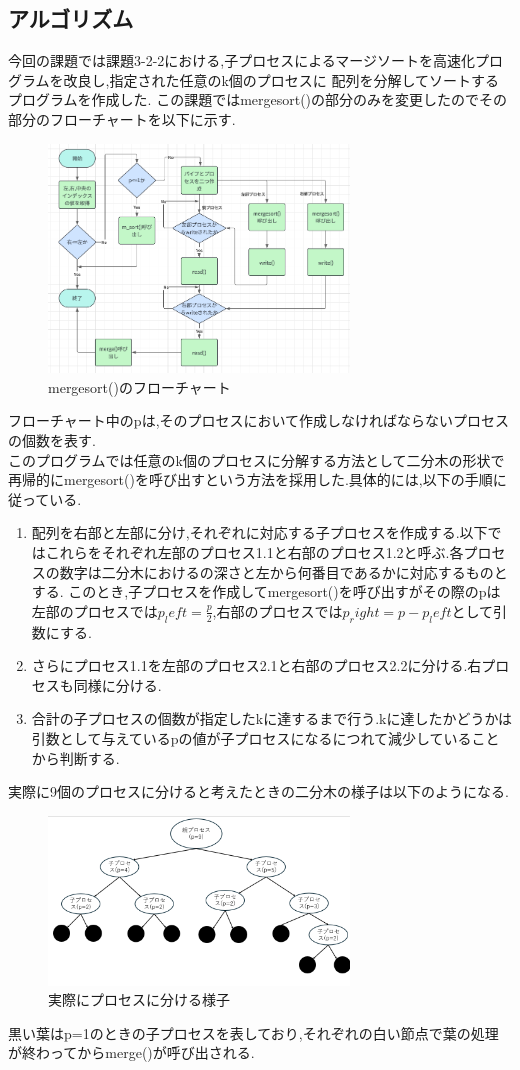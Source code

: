 \documentclass[dvipdfmx]{jarticle}
\begin{document}
\subsection{アルゴリズム}
今回の課題では課題3-2-2における,子プロセスによるマージソートを高速化プログラムを改良し,指定された任意のk個のプロセスに
配列を分解してソートするプログラムを作成した.
この課題ではmergesort()の部分のみを変更したのでその部分のフローチャートを以下に示す.
\begin{figure}[h]
    \centering
    \includegraphics[width=8cm]{hatten2hurotya.png}
    \caption{mergesort()のフローチャート}
\end{figure}
フローチャート中のpは,そのプロセスにおいて作成しなければならないプロセスの個数を表す.\\
このプログラムでは任意のk個のプロセスに分解する方法として二分木の形状で再帰的にmergesort()を呼び出すという方法を採用した.具体的には,以下の手順に従っている.
\begin{enumerate}
    \item 配列を右部と左部に分け,それぞれに対応する子プロセスを作成する.以下ではこれらをそれぞれ左部のプロセス1.1と右部のプロセス1.2と呼ぶ.各プロセスの数字は二分木におけるの深さと左から何番目であるかに対応するものとする.
    このとき,子プロセスを作成してmergesort()を呼び出すがその際のpは左部のプロセスでは$p_left=\frac{p}{2}$,右部のプロセスでは$p_right=p-p_left$として引数にする.
    \item さらにプロセス1.1を左部のプロセス2.1と右部のプロセス2.2に分ける.右プロセスも同様に分ける.
    \item 合計の子プロセスの個数が指定したkに達するまで行う.kに達したかどうかは引数として与えているpの値が子プロセスになるにつれて減少していることから判断する.
\end{enumerate}
実際に9個のプロセスに分けると考えたときの二分木の様子は以下のようになる.
\begin{figure}[h]
    \centering
    \includegraphics[width=8cm]{hatten2tree.png}
    \caption{実際にプロセスに分ける様子}
\end{figure}
黒い葉はp=1のときの子プロセスを表しており,それぞれの白い節点で葉の処理が終わってからmerge()が呼び出される.
\end{document}
